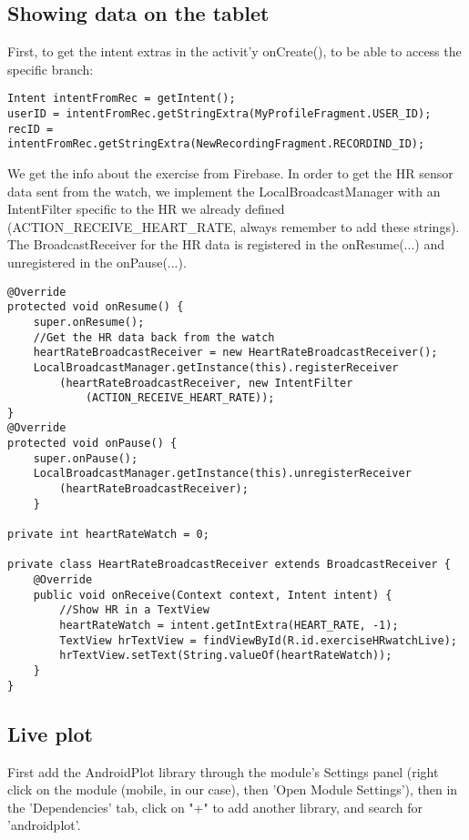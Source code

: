 \documentclass[11pt]{article}
\begin{document}
\subsection{Showing data on the tablet}
First, to get the intent extras in the activit'y onCreate(), to be able to access the specific branch:
\begin{lstlisting}
Intent intentFromRec = getIntent();
userID = intentFromRec.getStringExtra(MyProfileFragment.USER_ID);
recID = intentFromRec.getStringExtra(NewRecordingFragment.RECORDIND_ID);
\end{lstlisting}
We get the info about the exercise from Firebase. %
In order to get the HR sensor data sent from the watch, we implement the LocalBroadcastManager with an IntentFilter specific to the HR we already defined (ACTION_RECEIVE_HEART_RATE, always remember to add these strings). The BroadcastReceiver for the HR data is registered in the onResume(...) and unregistered in the onPause(...).
\begin{lstlisting}
@Override
protected void onResume() {
    super.onResume();
    //Get the HR data back from the watch
    heartRateBroadcastReceiver = new HeartRateBroadcastReceiver();
    LocalBroadcastManager.getInstance(this).registerReceiver
        (heartRateBroadcastReceiver, new IntentFilter
            (ACTION_RECEIVE_HEART_RATE));
}
@Override
protected void onPause() {
    super.onPause();
    LocalBroadcastManager.getInstance(this).unregisterReceiver
        (heartRateBroadcastReceiver);
    }
    
private int heartRateWatch = 0;

private class HeartRateBroadcastReceiver extends BroadcastReceiver {
    @Override
    public void onReceive(Context context, Intent intent) {
        //Show HR in a TextView
        heartRateWatch = intent.getIntExtra(HEART_RATE, -1);
        TextView hrTextView = findViewById(R.id.exerciseHRwatchLive);
        hrTextView.setText(String.valueOf(heartRateWatch));
    }
}
\end{lstlisting}

\subsection{Live plot}
First add the AndroidPlot library through the module's Settings panel (right click on the module (mobile, in our case), then 'Open Module Settings'), then in the 'Dependencies' tab, click on "+" to add another library, and search for 'androidplot'.
\end{document}
